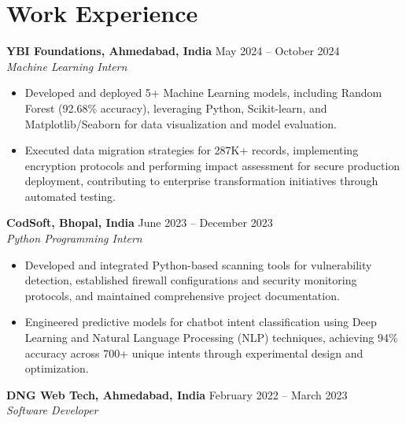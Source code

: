 \documentclass[a4paper,10pt]{article}
\begin{document}
\section*{Work Experience}
\textbf{YBI Foundations, Ahmedabad, India} \hfill May 2024 -- October 2024\\
\textit{Machine Learning Intern} \\
\begin{itemize}[leftmargin=*, itemsep=0pt, parsep=1pt]
\vspace{-6mm}
\item Developed and deployed 5+ Machine Learning models, including Random Forest (92.68\% accuracy), leveraging Python, Scikit-learn, and Matplotlib/Seaborn for data visualization and model evaluation.
\item Executed data migration strategies for 287K+ records, implementing encryption protocols and performing impact assessment for secure production deployment, contributing to enterprise transformation initiatives through automated testing.
\end{itemize}
\textbf{CodSoft, Bhopal, India} \hfill June 2023 -- December 2023\\
\textit{Python Programming Intern} \\
\begin{itemize}[leftmargin=*, itemsep=0pt, parsep=1pt]
\vspace{-6mm}
\item Developed and integrated Python-based scanning tools for vulnerability detection, established firewall configurations and security monitoring protocols, and maintained comprehensive project documentation.
\item Engineered predictive models for chatbot intent classification using Deep Learning and Natural Language Processing (NLP) techniques, achieving 94\% accuracy across 700+ unique intents through experimental design and optimization.
\vspace{-1mm}
\end{itemize}

\textbf{DNG Web Tech, Ahmedabad, India} \hfill February 2022 -- March 2023 \\
\textit{Software Developer} \\
\end{document}
